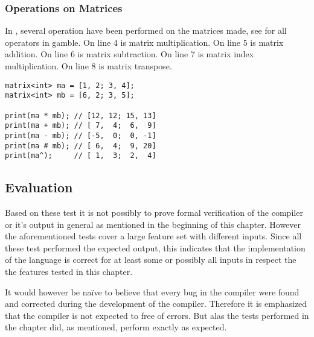 \subsubsection*{Operations on Matrices}
In , several operation have been performed on the matrices made, see  for all operators in \gls{gamble}. 
On line 4 is matrix multiplication.
On line 5 is matrix addition.
On line 6 is matrix subtraction.
On line 7 is matrix index multiplication.
On line 8 is matrix transpose.
\begin{lstlisting}[caption={Matrix multiplication in \gls{gamble}.},label={lst:matrix1},frame=tb]
matrix<int> ma = [1, 2; 3, 4];
matrix<int> mb = [6, 2; 3, 5];

print(ma * mb); // [12, 12; 15, 13]
print(ma + mb); // [ 7,  4;  6,  9]
print(ma - mb); // [-5,  0;  0, -1]
print(ma # mb); // [ 6,  4;  9, 20]
print(ma^);     // [ 1,  3;  2,  4]
\end{lstlisting}



\subsection*{Evaluation}
Based on these test it is not possibly to prove formal verification of the compiler or it's output in general as mentioned in the beginning of this chapter.
However the aforementioned tests cover a large feature set with different inputs.
Since all these test performed the expected output, this indicates that the implementation of the language is correct for at least some or possibly all inputs in respect the the features tested in this chapter.

It would however be naïve to believe that every bug in the compiler were found and corrected during the development of the compiler.%
Therefore it is emphasized that the compiler is not expected to free of errors. %
But alas the tests performed in the chapter did, as mentioned, perform exactly as expected. 